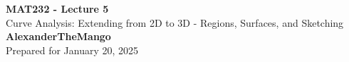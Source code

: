 \begin{titlepage}
    \null %
    \vfill
    \begin{center}
        {\fontsize{40}{48}\selectfont \bfseries MAT232 - Lecture 5}
        \vspace{20pt} \\
        {\LARGE Curve Analysis: Extending from 2D to 3D - Regions, Surfaces, and Sketching} \\
        \vspace{20pt}
        \textbf{AlexanderTheMango}
        \vspace{8pt}
        \\ Prepared for January 20, 2025
    \end{center}
    \vfill
\end{titlepage}
